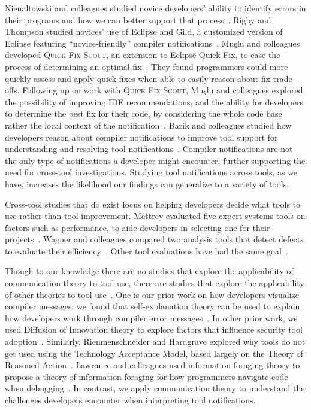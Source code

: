\documentclass{llncs}
\begin{document}
Nienaltowski and colleagues studied novice developers' ability to identify errors in their programs and how we can better support that process~\cite{Nienaltowski:2008:Compiler}.
Rigby and Thompson studied novices' use of Eclipse and Gild, a customized version of Eclipse featuring ``novice-friendly'' compiler notifications~\cite{Rigby:2005:Novice}.
Mu\c{s}lu and colleagues developed \textsc{Quick Fix Scout}, an extension to Eclipse Quick Fix, to ease the process of determining an
optimal fix~\cite{Mucslu:2012:Speculative}. They found programmers could more quickly assess and apply quick fixes when able to easily reason about fix trade-offs.
Following up on work with \textsc{Quick Fix Scout}, Mu\c{s}lu and colleagues explored the possibility of improving IDE recommendations, and the ability for developers to determine the best fix for their code, by considering the whole code base rather the local context of the notification~\cite{mucslu2012improving}.
Barik and colleagues studied how developers reason about compiler notifications to improve tool support for understanding and resolving tool notifications~\cite{barik14}.
Compiler notifications are not the only type of notifications a developer might encounter, further supporting the need for cross-tool investigations.
Studying tool notifications across tools, as we have, increases the likelihood our findings can generalize to a variety of tools.

Cross-tool studies that do exist focus on helping developers decide what tools to use rather than tool improvement.
Mettrey evaluated five expert systems tools on factors such as performance, to aide developers in selecting one for their projects~\cite{mettrey1991comparative}.
Wagner and colleagues compared two analysis tools that detect defects to evaluate their efficiency~\cite{wagner2008evaluation}.
Other tool evaluations have had the same goal~\cite{roy2009comparison,zheng2006value}.

Though to our knowledge there are no studies that explore the applicability of communication theory to tool use, there are studies that explore the applicability of other theories to tool use~\cite{barik14,xiao2014social,riemenschneider2001explaining}.  
One is our prior work on how developers visualize compiler messages; we found that self-explanation theory can be used to explain how developers work through compiler error messages~\cite{barik14}. 
In other prior work, we used Diffusion of Innovation theory to explore factors that influence 
security tool adoption~\cite{xiao2014social}. 
Similarly, Rienmenschneider and Hardgrave explored why tools do not get used using the Technology Acceptance Model, based largely on the Theory of Reasoned Action~\cite{riemenschneider2001explaining}.
Lawrance and colleagues used information foraging theory to propose a theory of information foraging for how programmers navigate code when debugging~\cite{lawrance2013programmers}. 
In contrast, we apply communication theory to understand the challenges 
developers encounter when interpreting tool notifications.
\end{document}
